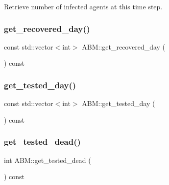 Retrieve number of infected agents at this time step. 

\mbox{\label{classABM_af50856608f9c917c49e01ea86f4a6046}} 
\subsubsection{\texorpdfstring{get\+\_\+recovered\+\_\+day()}{get\_recovered\_day()}}
{\footnotesize\ttfamily const std\+::vector$<$int$>$ A\+B\+M\+::get\+\_\+recovered\+\_\+day (\begin{DoxyParamCaption}{ }\end{DoxyParamCaption}) const\hspace{0.3cm}{\ttfamily [inline]}}

\mbox{\label{classABM_ae2cf88fd41cb86336057e20206ac63c2}} 
\subsubsection{\texorpdfstring{get\+\_\+tested\+\_\+day()}{get\_tested\_day()}}
{\footnotesize\ttfamily const std\+::vector$<$int$>$ A\+B\+M\+::get\+\_\+tested\+\_\+day (\begin{DoxyParamCaption}{ }\end{DoxyParamCaption}) const\hspace{0.3cm}{\ttfamily [inline]}}

\mbox{\label{classABM_a5eb770b49361e9d689bdcc9bdb2a28c0}} 
\subsubsection{\texorpdfstring{get\+\_\+tested\+\_\+dead()}{get\_tested\_dead()}}
{\footnotesize\ttfamily int A\+B\+M\+::get\+\_\+tested\+\_\+dead (\begin{DoxyParamCaption}{ }\end{DoxyParamCaption}) const\hspace{0.3cm}{\ttfamily [inline]}}



